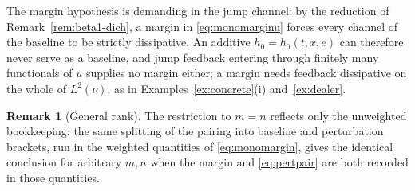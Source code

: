 \documentclass[preprint,12pt]{elsarticle}
\newcommand{\Lnu}{L^2(\nu)}
\numberwithin{equation}{section}
\theoremstyle{plain}
\theoremstyle{definition}
\theoremstyle{\PaperRemarkStyle}
\newtheorem{remark}[theorem]{Remark}
\begin{document}
\noindent The margin hypothesis is demanding in the jump channel: by the reduction of
Remark~\ref{rem:beta1-dich}, a margin in \eqref{eq:monomarginu} forces every channel of
the baseline to be strictly dissipative. An additive $h_0=h_0(t,x,e)$ can therefore never serve as a baseline, and
jump feedback entering through finitely many functionals of $u$ supplies no margin
either; a margin needs feedback dissipative on the whole of $\Lnu$, as in
Examples~\ref{ex:concrete}(i) and~\ref{ex:dealer}.

\begin{remark}[General rank]\label{rem:generalrank}
The restriction to $m=n$ reflects only the unweighted bookkeeping: the same splitting of
the pairing into baseline and perturbation brackets, run in the weighted quantities of
\eqref{eq:monomargin}, gives the identical conclusion for arbitrary $m,n$ when the margin
and \eqref{eq:pertpair} are both recorded in those quantities.
\end{remark}
\end{document}
